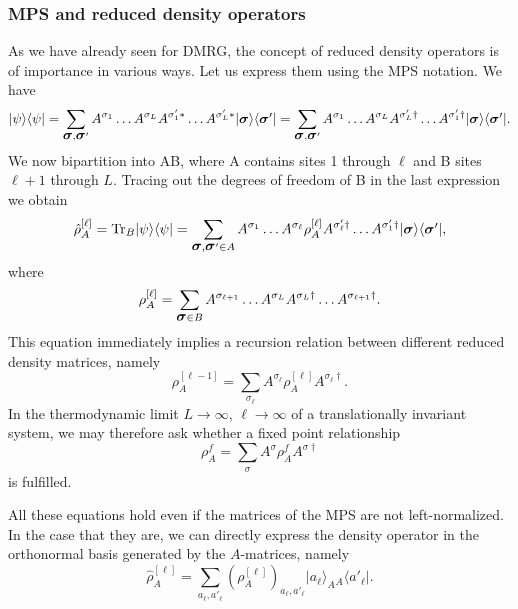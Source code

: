 \documentclass[a4paper,10pt,oneside,onecolumn,1p,times]{elsarticle}
\newcommand{\tr}{{\rm Tr }}
\newcommand{\bra}[1]{\mbox{$\langle #1  |$}}
\newcommand{\ket}[1]{\mbox{$| #1  \rangle$}}
\newcommand{\fat}[1]{\mbox{\boldmath$#1$\unboldmath}}	%
\begin{document}
\subsubsection{MPS and reduced density operators}
As we have already seen for DMRG, the concept of reduced density operators is of importance in various ways. Let us express them using the MPS notation. We have
\begin{equation}
\ket{\psi}\bra{\psi} = \sum_{\fat{\sigma},\fat{\sigma}'} A^{\sigma_1} \ldots A^{\sigma_L} A^{\sigma'_1*} \ldots A^{\sigma'_L*} \ket{\fat{\sigma}} \bra{\fat{\sigma}'} = 
\sum_{\fat{\sigma},\fat{\sigma}'} A^{\sigma_1} \ldots A^{\sigma_L} A^{\sigma'_L\dagger} \ldots A^{\sigma'_1\dagger} \ket{\fat{\sigma}} \bra{\fat{\sigma}'} .
\label{eq:fullstateprojector}
\end{equation}
We now bipartition into AB, where A contains sites 1 through $\ell$ and B sites $\ell+1$ through $L$. Tracing out the degrees of freedom of B in the last expression we obtain
\begin{equation}
\hat{\rho}_A^{[\ell]} = \tr_B \ket{\psi}\bra{\psi} = \sum_{\fat{\sigma},\fat{\sigma}'\in A} 
A^{\sigma_1} \ldots A^{\sigma_\ell} \rho_A^{[\ell]} A^{\sigma'_\ell\dagger} \ldots A^{\sigma'_1\dagger} \ket{\fat{\sigma}} \bra{\fat{\sigma}'} ,
\end{equation}
where
\begin{equation}
\rho_A^{[\ell]} =  \sum_{\fat{\sigma}\in B} A^{\sigma_{\ell+1}} \ldots A^{\sigma_L} A^{\sigma_L\dagger} \ldots A^{\sigma_{\ell+1}\dagger} .
\end{equation}
This equation immediately implies a recursion relation between different reduced density matrices, namely
\begin{equation}
\rho_A^{[\ell-1]} = \sum_{\sigma_\ell} A^{\sigma_\ell} \rho_A^{[\ell]} A^{\sigma_\ell\dagger} .
\label{eq:rhoarecursion}
\end{equation}
In the thermodynamic limit $L\rightarrow\infty$, $\ell\rightarrow\infty$ of a translationally invariant system, we may therefore ask whether a fixed point relationship
\begin{equation}
\rho_A^f = \sum_{\sigma} A^{\sigma} \rho_A^{f} A^{\sigma\dagger} 
\end{equation}
is fulfilled.

All these equations hold even if the matrices of the MPS are not left-normalized. In the case that they are, we can directly express the density operator in the orthonormal basis generated by the $A$-matrices, namely
\begin{equation}
\hat{\rho}_A^{[\ell]} = \sum_{a_\ell, a'_\ell} (\rho_A^{[\ell]})_{a_\ell, a'_\ell} \ket{a_\ell}_A \phantom{{}}_A\bra{a'_\ell} .
\end{equation}
\end{document}
